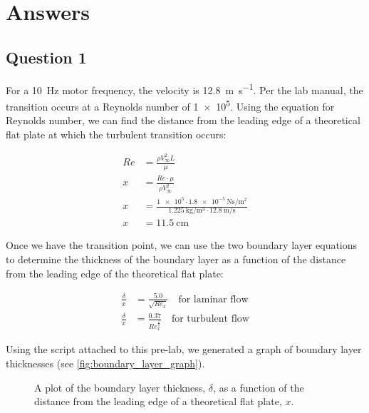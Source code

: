 \chapter{Answers}
\label{cp:answers}
\section{Question 1}

For a \qty{10}{\hertz} motor frequency, the velocity is \qty{12.8}{\meter\per\second}. Per the lab manual, the transition occurs at a Reynolds number of \num{1e5}. Using the equation for Reynolds number, we can find the distance from the leading edge of a theoretical flat plate at which the turbulent transition occurs:

\begin{align}
    Re &= \frac{\rho V_\infty^2 L}{\mu} \\
    x &= \frac{Re\cdot\mu}{\rho V_\infty^2} \nonumber \\
    x &= \frac{\num{1e5}\cdot\qty{1.8e-5}{\newton\second\per\meter\squared}}{\qty{1.225}{\kilo\gram\per\meter\cubed}\cdot\qty{12.8}{\meter\per\second}} \nonumber \\
    x &= \qty{11.5}{\centi\meter} \nonumber
\end{align}

Once we have the transition point, we can use the two boundary layer equations to determine the thickness of the boundary layer as a function of the distance from the leading edge of the theoretical flat plate:

\begin{align}
    \frac{\delta}{x} &= \frac{5.0}{\sqrt{Re_x}}\quad\text{for laminar flow} \\
    \frac{\delta}{x} &= \frac{0.37}{Re_x^{\frac{1}{5}}}\quad\text{for turbulent flow}
\end{align}

Using the script attached to this pre-lab, we generated a graph of boundary layer thicknesses (see \autoref{fig:boundary_layer_graph}).

\begin{figure}[htpb]
    \centering
    
    \caption[A plot of the boundary layer thickness as a function of the distance from the leading edge of a theoretical flat plate.]{A plot of the boundary layer thickness, $\delta$, as a function of the distance from the leading edge of a theoretical flat plate, $x$.}
    \label{fig:boundary_layer_graph}
\end{figure}

